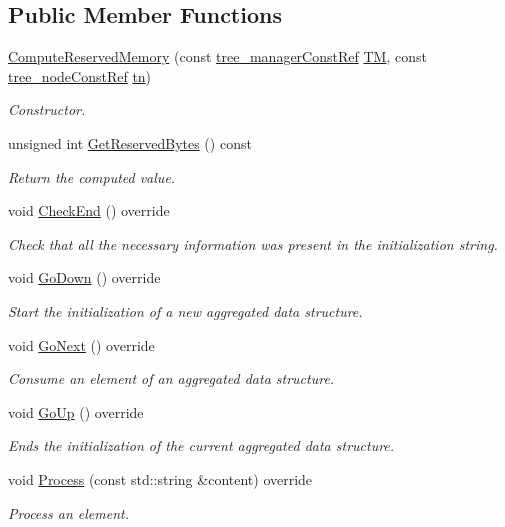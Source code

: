 \subsection*{Public Member Functions}
\begin{DoxyCompactItemize}
\item 
\hyperlink{classComputeReservedMemory_a2544d3a9d8e8bb227eef45398fa8f38e}{Compute\+Reserved\+Memory} (const \hyperlink{tree__manager_8hpp_a792e3f1f892d7d997a8d8a4a12e39346}{tree\+\_\+manager\+Const\+Ref} \hyperlink{classComputeReservedMemory_a1de84842d1f10700a780d6aea075fc89}{TM}, const \hyperlink{tree__node_8hpp_a3cf5d02292c940f3892425a5b5fdec3c}{tree\+\_\+node\+Const\+Ref} \hyperlink{classComputeReservedMemory_abbd1c91f8c511b663f8a9e5816e70153}{tn})
\begin{DoxyCompactList}\small\item\em Constructor. \end{DoxyCompactList}\item 
unsigned int \hyperlink{classComputeReservedMemory_a2563b08ab753dea5d8c55708d63e3318}{Get\+Reserved\+Bytes} () const
\begin{DoxyCompactList}\small\item\em Return the computed value. \end{DoxyCompactList}\item 
void \hyperlink{classComputeReservedMemory_a5353a626c8ef1f507c379bec8f5fb36e}{Check\+End} () override
\begin{DoxyCompactList}\small\item\em Check that all the necessary information was present in the initialization string. \end{DoxyCompactList}\item 
void \hyperlink{classComputeReservedMemory_aad5d8055485eb76d21ee52ce5a4d18c7}{Go\+Down} () override
\begin{DoxyCompactList}\small\item\em Start the initialization of a new aggregated data structure. \end{DoxyCompactList}\item 
void \hyperlink{classComputeReservedMemory_a091e52fa0cbf1db832a824c11c7c75d2}{Go\+Next} () override
\begin{DoxyCompactList}\small\item\em Consume an element of an aggregated data structure. \end{DoxyCompactList}\item 
void \hyperlink{classComputeReservedMemory_acce81c68136abf8d4f6db310947454bf}{Go\+Up} () override
\begin{DoxyCompactList}\small\item\em Ends the initialization of the current aggregated data structure. \end{DoxyCompactList}\item 
void \hyperlink{classComputeReservedMemory_a2cb9e87cd6acac14021dede18b50f54b}{Process} (const std\+::string \&content) override
\begin{DoxyCompactList}\small\item\em Process an element. \end{DoxyCompactList}\end{DoxyCompactItemize}
